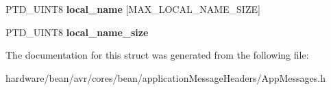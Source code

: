 \begin{DoxyCompactItemize}
\item 
P\+T\+D\+\_\+\+U\+I\+N\+T8 {\bfseries local\+\_\+name} \mbox{[}M\+A\+X\+\_\+\+L\+O\+C\+A\+L\+\_\+\+N\+A\+M\+E\+\_\+\+S\+I\+ZE\mbox{]}\hypertarget{struct_b_t___r_a_d_i_o_c_o_n_f_i_g___t_a07432b46b98c8f527882134e6a9c6299}{}\label{struct_b_t___r_a_d_i_o_c_o_n_f_i_g___t_a07432b46b98c8f527882134e6a9c6299}

\item 
P\+T\+D\+\_\+\+U\+I\+N\+T8 {\bfseries local\+\_\+name\+\_\+size}\hypertarget{struct_b_t___r_a_d_i_o_c_o_n_f_i_g___t_a1028444b2f941f543f3e63f2f1b7d531}{}\label{struct_b_t___r_a_d_i_o_c_o_n_f_i_g___t_a1028444b2f941f543f3e63f2f1b7d531}

\end{DoxyCompactItemize}


The documentation for this struct was generated from the following file\+:\begin{DoxyCompactItemize}
\item 
hardware/bean/avr/cores/bean/application\+Message\+Headers/App\+Messages.\+h\end{DoxyCompactItemize}

